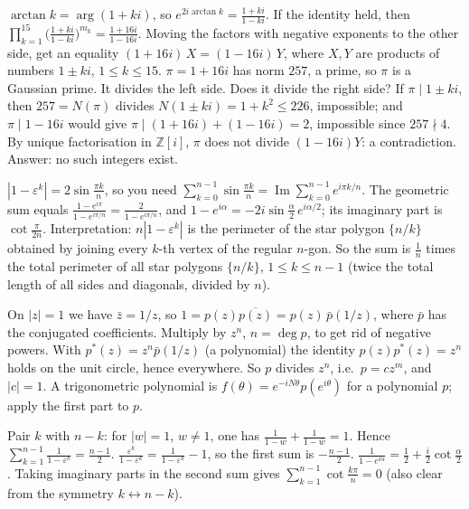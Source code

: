 \documentclass[11pt,a4paper]{article}
\begin{document}
 $\arctan k=\arg(1+ki)$, so $e^{2i\arctan k}=\frac{1+ki}{1-ki}$. If the identity held, then $\prod_{k=1}^{15}\bigl(\frac{1+ki}{1-ki}\bigr)^{m_k}=\frac{1+16i}{1-16i}$. Moving the factors with negative exponents to the other side, get an equality $(1+16i)\,X=(1-16i)\,Y$, where $X,Y$ are products of numbers $1\pm ki$, $1\le k\le15$.
 $\pi=1+16i$ has norm $257$, a prime, so $\pi$ is a Gaussian prime. It divides the left side. Does it divide the right side?
 If $\pi\mid1\pm ki$, then $257=N(\pi)$ divides $N(1\pm ki)=1+k^2\le226$, impossible; and $\pi\mid1-16i$ would give $\pi\mid(1+16i)+(1-16i)=2$, impossible since $257\nmid4$. By unique factorisation in $\mathbb Z[i]$, $\pi$ does not divide $(1-16i)Y$: a contradiction. Answer: no such integers exist.

 $|1-\varepsilon^k|=2\sin\frac{\pi k}n$, so you need $\sum_{k=0}^{n-1}\sin\frac{\pi k}n=\operatorname{Im}\sum_{k=0}^{n-1}e^{i\pi k/n}$.
 The geometric sum equals $\frac{1-e^{i\pi}}{1-e^{i\pi/n}}=\frac{2}{1-e^{i\pi/n}}$, and $1-e^{i\alpha}=-2i\sin\frac\alpha2\,e^{i\alpha/2}$; its imaginary part is $\cot\frac{\pi}{2n}$.
 Interpretation: $n|1-\varepsilon^k|$ is the perimeter of the star polygon $\{n/k\}$ obtained by joining every $k$-th vertex of the regular $n$-gon. So the sum is $\frac1n$ times the total perimeter of all star polygons $\{n/k\}$, $1\le k\le n-1$ (twice the total length of all sides and diagonals, divided by $n$).

 On $|z|=1$ we have $\bar z=1/z$, so $1=p(z)\overline{p(z)}=p(z)\,\bar p(1/z)$, where $\bar p$ has the conjugated coefficients. Multiply by $z^n$, $n=\deg p$, to get rid of negative powers.
 With $p^*(z)=z^n\bar p(1/z)$ (a polynomial) the identity $p(z)p^*(z)=z^n$ holds on the unit circle, hence everywhere. So $p$ divides $z^n$, i.e.\ $p=cz^m$, and $|c|=1$.
 A trigonometric polynomial is $f(\theta)=e^{-iN\theta}p(e^{i\theta})$ for a polynomial $p$; apply the first part to $p$.

 Pair $k$ with $n-k$: for $|w|=1$, $w\ne1$, one has $\frac1{1-w}+\frac1{1-\bar w}=1$. Hence $\sum_{k=1}^{n-1}\frac1{1-\varepsilon^k}=\frac{n-1}2$.
 $\frac{\varepsilon^k}{1-\varepsilon^k}=\frac1{1-\varepsilon^k}-1$, so the first sum is $-\frac{n-1}2$.
 $\frac1{1-e^{i\alpha}}=\frac12+\frac i2\cot\frac\alpha2$. Taking imaginary parts in the second sum gives $\sum_{k=1}^{n-1}\cot\frac{k\pi}n=0$ (also clear from the symmetry $k\leftrightarrow n-k$).
\end{document}
